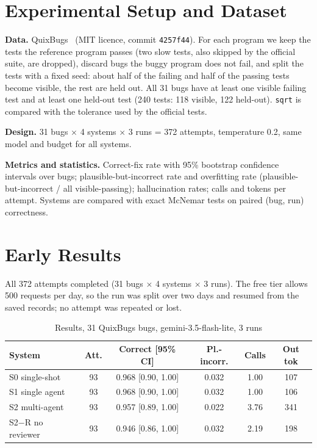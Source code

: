 \documentclass[conference]{IEEEtran}
\begin{document}
\section{Experimental Setup and Dataset}
\textbf{Data.} QuixBugs~\cite{quixbugs} (MIT licence, commit \texttt{4257f44}).
For each program we keep the tests the reference program passes (two slow
tests, also skipped by the official suite, are dropped), discard bugs the
buggy program does not fail, and split the tests with a fixed seed: about half
of the failing and half of the passing tests become visible, the rest are
held out. All 31 bugs have at least one visible failing test and at least one
held-out test (240 tests: 118 visible, 122 held-out). \texttt{sqrt} is compared with the
tolerance used by the official tests.

\textbf{Design.} 31 bugs $\times$ 4 systems $\times$ 3 runs = 372 attempts,
temperature 0.2, same model and budget for all systems.

\textbf{Metrics and statistics.} Correct-fix rate with 95\% bootstrap
confidence intervals over bugs; plausible-but-incorrect rate and overfitting
rate (plausible-but-incorrect / all visible-passing); hallucination rates;
calls and tokens per attempt. Systems are compared with exact McNemar tests on
paired (bug, run) correctness.

\section{Early Results}
All 372 attempts completed (31 bugs $\times$ 4 systems $\times$ 3 runs). The free
tier allows 500 requests per day, so the run was split over two days and resumed
from the saved records; no attempt was repeated or lost.

\begin{table}[h]
\caption{Results, 31 QuixBugs bugs, gemini-3.5-flash-lite, 3 runs}
\label{tab:res}
\centering
\footnotesize
\begin{tabular}{@{}lccccc@{}}
\toprule
System & Att. & Correct [95\% CI] & Pl.-incorr. & Calls & Out tok \\
\midrule
S0 single-shot & 93 & 0.968 [0.90, 1.00] & 0.032 & 1.00 & 107 \\
S1 single agent & 93 & 0.968 [0.90, 1.00] & 0.032 & 1.00 & 106 \\
S2 multi-agent & 93 & 0.957 [0.89, 1.00] & 0.022 & 3.76 & 341 \\
S2$-$R no reviewer & 93 & 0.946 [0.86, 1.00] & 0.032 & 2.19 & 198 \\
\bottomrule
\end{tabular}
\end{table}
\end{document}
